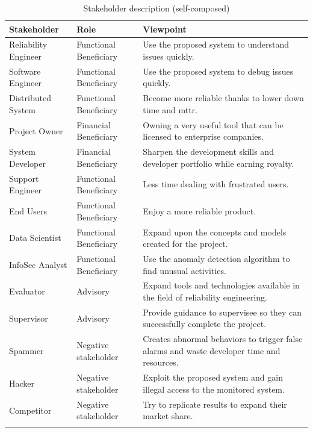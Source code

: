 \begin{longtable}{|p{35mm}|p{44mm}|p{72mm}|}
    \hline
    \textbf{Stakeholder} &
    \textbf{Role} &
    \textbf{Viewpoint} 
    \\ \hline
    
    Reliability Engineer &
    Functional Beneficiary &
    Use the proposed system to understand issues quickly. \\ \hline
    
    Software Engineer &
    Functional Beneficiary &
    Use the proposed system to debug issues quickly. \\ \hline
    
    Distributed System &
    Functional Beneficiary &
    Become more reliable thanks to lower down time and \ac{mttr}. \\ \hline
    
    Project Owner &
    Financial Beneficiary &
    Owning a very useful tool that can be licensed to enterprise companies. \\ \hline
    
    System Developer &
    Financial Beneficiary &
    Sharpen the development skills and developer portfolio while earning royalty. \\ \hline
    
    Support Engineer &
    Functional Beneficiary &
    Less time dealing with frustrated users. \\ \hline
    
    End Users &
    Functional Beneficiary &
    Enjoy a more reliable product. \\ \hline
    
    Data Scientist &
    Functional Beneficiary &
    Expand upon the concepts and models created for the project. \\ \hline
    
    InfoSec Analyst &
    Functional Beneficiary &
    Use the anomaly detection algorithm to find unusual activities. \\ \hline
    
    Evaluator & 
    Advisory &
    Expand tools and technologies available in the field of reliability engineering. \\ \hline
    
    Supervisor &
    Advisory &
    Provide guidance to supervisee so they can successfully complete the project. \\ \hline
    
    Spammer &
    Negative stakeholder & Creates abnormal behaviors to trigger false alarms and waste developer time and resources. \\ \hline
    
    Hacker &
    Negative stakeholder &
    Exploit the proposed system and gain illegal access to the monitored system. \\ \hline
    
    Competitor &
    Negative stakeholder &
    Try to replicate results to expand their market share. \\ \hline
\caption{Stakeholder description (self-composed)}
\end{longtable}